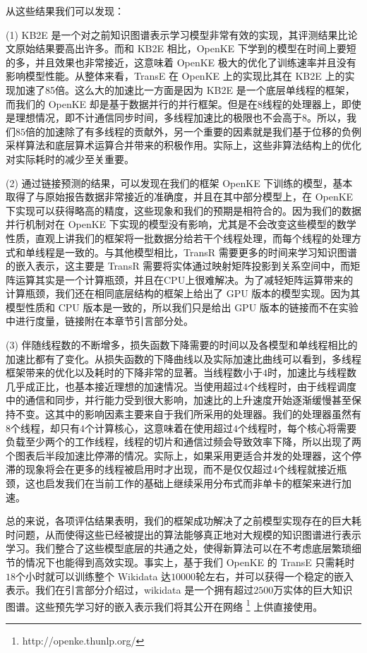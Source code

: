从这些结果我们可以发现：

(1) KB2E \cite{lin2015learning} 是一个对之前知识图谱表示学习模型非常有效的实现，其评测结果比论文原始结果要高出许多。而和 KB2E 相比，OpenKE 下学到的模型在时间上要短的多，并且效果也非常接近，这意味着 OpenKE 极大的优化了训练速率并且没有影响模型性能。从整体来看，TransE 在 OpenKE 上的实现比其在 KB2E 上的实现加速了85倍。这么大的加速比一方面是因为 KB2E 是一个底层单线程的框架，而我们的 OpenKE 却是基于数据并行的并行框架。但是在$8$线程的处理器上，即使是理想情况，即不计通信同步时间，多线程加速比的极限也不会高于$8$。所以，我们$85$倍的加速除了有多线程的贡献外，另一个重要的因素就是我们基于位移的负例采样算法和底层算术运算合并带来的积极作用。实际上，这些非算法结构上的优化对实际耗时的减少至关重要。


(2) 通过链接预测的结果，可以发现在我们的框架 OpenKE 下训练的模型，基本取得了与原始报告数据非常接近的准确度，并且在其中部分模型上，在 OpenKE 下实现可以获得略高的精度，这些现象和我们的预期是相符合的。因为我们的数据并行机制对在 OpenKE 下实现的模型没有影响，尤其是不会改变这些模型的数学性质，直观上讲我们的框架将一批数据分给若干个线程处理，而每个线程的处理方式和单线程是一致的。与其他模型相比，TransR 需要更多的时间来学习知识图谱的嵌入表示，这主要是 TransR 需要将实体通过映射矩阵投影到关系空间中，而矩阵运算其实是一个计算瓶颈，并且在CPU上很难解决。为了减轻矩阵运算带来的计算瓶颈，我们还在相同底层结构的框架上给出了 GPU 版本的模型实现。因为其模型性质和 CPU 版本是一致的，所以我们只是给出 GPU 版本的链接而不在实验中进行度量，链接附在本章节引言部分处。

(3) 伴随线程数的不断增多，损失函数下降需要的时间以及各模型和单线程相比的加速比都有了变化。从损失函数的下降曲线以及实际加速比曲线可以看到，多线程框架带来的优化以及耗时的下降非常的显著。当线程数小于$4$时，加速比与线程数几乎成正比，也基本接近理想的加速情况。当使用超过$4$个线程时，由于线程调度中的通信和同步，并行能力受到很大影响，加速比的上升速度开始逐渐缓慢甚至保持不变。这其中的影响因素主要来自于我们所采用的处理器。我们的处理器虽然有$8$个线程，却只有$4$个计算核心，这意味着在使用超过$4$个线程时，每个核心将需要负载至少两个的工作线程，线程的切片和通信过频会导致效率下降，所以出现了两个图表后半段加速比停滞的情况。实际上，如果采用更适合并发的处理器，这个停滞的现象将会在更多的线程被启用时才出现，而不是仅仅超过$4$个线程就接近瓶颈，这也启发我们在当前工作的基础上继续采用分布式而非单卡的框架来进行加速。

总的来说，各项评估结果表明，我们的框架成功解决了之前模型实现存在的巨大耗时问题，从而使得这些已经被提出的算法能够真正地对大规模的知识图谱进行表示学习。我们整合了这些模型底层的共通之处，使得新算法可以在不考虑底层繁琐细节的情况下也能得到高效实现。事实上，基于我们 OpenKE 的 TransE 只需耗时$18$个小时就可以训练整个 Wikidata 达$10000$轮左右，并可以获得一个稳定的嵌入表示。我们在引言部分介绍过，wikidata 是一个拥有超过$2500$万实体的巨大知识图谱。这些预先学习好的嵌入表示我们将其公开在网络 \footnote{http://openke.thunlp.org/} 上供直接使用。

